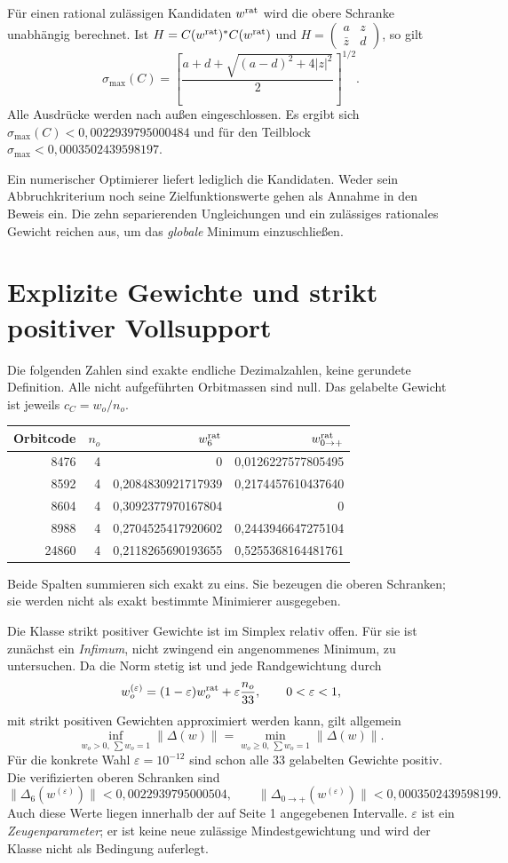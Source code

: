 \documentclass[10pt,a4paper]{article}
\begin{document}
Für einen rational zulässigen Kandidaten $w^{\rm rat}$ wird die obere
Schranke unabhängig berechnet. Ist $H=C(w^{\rm rat})^*C(w^{\rm rat})$
und $H=\left(\begin{smallmatrix}a&z\\\bar z&d\end{smallmatrix}\right)$, so gilt
\[
 \sigma_{\max}(C)=\left[\frac{a+d+\sqrt{(a-d)^2+4|z|^2}}2\right]^{1/2}.
\]
Alle Ausdrücke werden nach außen eingeschlossen. Es ergibt sich
$\sigma_{\max}(C)<0{,}0022939795000484$ und für den Teilblock
$\sigma_{\max}<0{,}0003502439598197$.

Ein numerischer Optimierer liefert lediglich die Kandidaten. Weder sein
Abbruchkriterium noch seine Zielfunktionswerte gehen als Annahme in den
Beweis ein. Die zehn separierenden Ungleichungen und ein zulässiges
rationales Gewicht reichen aus, um das \emph{globale} Minimum einzuschließen.

\newpage
\section{Explizite Gewichte und strikt positiver Vollsupport}
Die folgenden Zahlen sind exakte endliche Dezimalzahlen, keine gerundete
Definition. Alle nicht aufgeführten Orbitmassen sind null. Das gelabelte
Gewicht ist jeweils $c_C=w_o/n_o$.
\begin{center}\begin{tabular}{rrrr}\toprule
Orbitcode & $n_o$ & $w^{\rm rat}_6$ & $w^{\rm rat}_{0\to+}$\\\midrule
8476 & 4 & 0 & 0,0126227577805495\\
8592 & 4 & 0,2084830921717939 & 0,2174457610437640\\
8604 & 4 & 0,3092377970167804 & 0\\
8988 & 4 & 0,2704525417920602 & 0,2443946647275104\\
24860 & 4 & 0,2118265690193655 & 0,5255368164481761\\\bottomrule
\end{tabular}\end{center}
Beide Spalten summieren sich exakt zu eins. Sie bezeugen die oberen
Schranken; sie werden nicht als exakt bestimmte Minimierer ausgegeben.

Die Klasse strikt positiver Gewichte ist im Simplex relativ offen. Für sie ist zunächst ein
\emph{Infimum}, nicht zwingend ein angenommenes Minimum, zu untersuchen.
Da die Norm stetig ist und jede Randgewichtung durch
\[
 w_o^{(\varepsilon)}=(1-\varepsilon)w_o^{\rm rat}
                       +\varepsilon\frac{n_o}{33},\qquad 0<\varepsilon<1,
\]
mit strikt positiven Gewichten approximiert werden kann, gilt allgemein
\[
 \inf_{w_o>0,\,\sum w_o=1}\|\Delta(w)\|
 =\min_{w_o\geq0,\,\sum w_o=1}\|\Delta(w)\|.
\]
Für die konkrete Wahl $\varepsilon=10^{-12}$ sind schon alle 33 gelabelten
Gewichte positiv. Die verifizierten oberen Schranken sind
\[
 \|\Delta_6(w^{(\varepsilon)})\|<0{,}0022939795000504,\qquad
 \|\Delta_{0\to+}(w^{(\varepsilon)})\|<0{,}0003502439598199.
\]
Auch diese Werte liegen innerhalb der auf Seite 1 angegebenen Intervalle.
$\varepsilon$ ist ein \emph{Zeugenparameter}; er ist keine neue zulässige
Mindestgewichtung und wird der Klasse nicht als Bedingung auferlegt.
\end{document}
